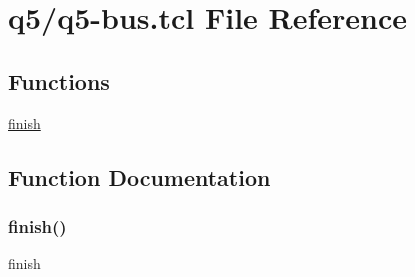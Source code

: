 \hypertarget{q5-bus_8tcl}{}\section{q5/q5-\/bus.tcl File Reference}
\label{q5-bus_8tcl}
\subsection*{Functions}
\begin{DoxyCompactItemize}
\item 
\hyperlink{q5-bus_8tcl_a30728837c246b65ef76298af0101d99c}{finish}
\end{DoxyCompactItemize}


\subsection{Function Documentation}
\mbox{\label{q5-bus_8tcl_a30728837c246b65ef76298af0101d99c}} 
\subsubsection{\texorpdfstring{finish()}{finish()}}
{\footnotesize\ttfamily finish}


